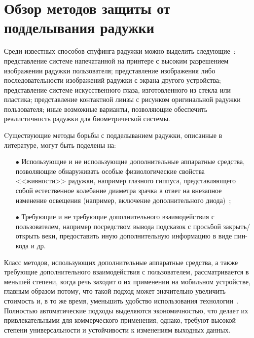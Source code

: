 \section{Обзор методов защиты от подделывания радужки}
\label{sec:anti-spoofing-methods-overview}

Среди известных способов спуфинга радужки можно выделить следующие~\cite{he_2009_s,galbally_2012,czajka_2018}: представление системе напечатанной на принтере с высоким разрешением изображении радужки пользователя; представление изображения либо последовательности изображений радужки с экрана другого устройства; представление системе искусственного глаза, изготовленного из стекла или пластика; представление контактной линзы с рисунком оригинальной радужки пользователя; иные возможные варианты, позволяющие обеспечить реалистичность радужки для биометрической системы.

Cуществующие методы борьбы с подделыванием радужки, описанные в литературе, могут быть поделены на:

\begin{enumerate}
	\item[$\bullet$] Использующие и не использующие дополнительные аппаратные средства, позволяющие обнаруживать особые физиологические свойства <<живности>> радужки, например глазного гиппуса, представляющего собой естественное колебание диаметра зрачка в ответ на внезапное изменение освещения (например, включение дополнительного диода)~\cite{galbally_2012,czajka_2018};
	\item[$\bullet$] Требующие и не требующие дополнительного взаимодействия с пользователем, например посредством вывода подсказок с просьбой закрыть/открыть веки, предоставить иную дополнительную информацию в виде пин-кода и др.
\end{enumerate}

Класс методов, использующих дополнительные аппаратные средства, а также требующие дополнительного взаимодействия с пользователем, рассматривается в меньшей степени, когда речь заходит о их применении на мобильном устройстве, главным образом потому, что такой подход может значительно увеличить стоимость и, в то же время, уменьшить удобство использования технологии~\cite{odinokikh_antispoofing_2018}. Полностью автоматические подходы выделяются экономичностью, что делает их привлекательными для коммерческого применения, однако, требуют высокой степени универсальности и устойчивости к изменениям выходных данных.

